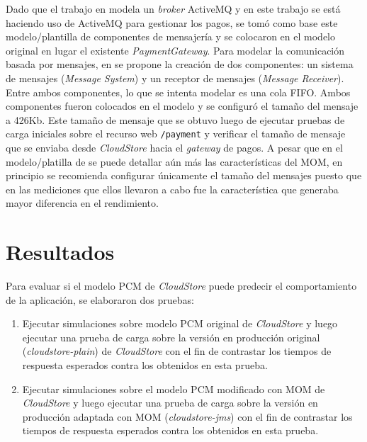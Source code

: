 \documentclass[conference]{IEEEtran}
\begin{document}
Dado que el trabajo en \cite{happe-et-al} modela un \emph{broker} ActiveMQ y en este trabajo se está haciendo uso de ActiveMQ para gestionar los pagos, se tomó como base este modelo/plantilla de componentes de mensajería y se colocaron en el modelo original en lugar el existente \emph{PaymentGateway}. Para modelar la comunicación basada por mensajes, en \cite{happe-et-al} se propone la creación de dos componentes: un sistema de mensajes (\emph{Message System}) y un receptor de mensajes (\emph{Message Receiver}). Entre ambos componentes, lo que se intenta modelar es una cola FIFO. Ambos componentes fueron colocados en el modelo y se configuró el tamaño del mensaje a 426Kb. Este tamaño de mensaje que se obtuvo luego de ejecutar pruebas de carga iniciales sobre el recurso web \texttt{/payment} y verificar el tamaño de mensaje que se enviaba desde \emph{CloudStore} hacia el \emph{gateway} de pagos. A pesar que en el modelo/platilla de \cite{happe-et-al} se puede detallar aún más las características del MOM, en principio se recomienda configurar únicamente el tamaño del mensajes puesto que en las mediciones que ellos llevaron a cabo fue la característica que generaba mayor diferencia en el rendimiento.

\section{Resultados} \label{sec:resultados}
Para evaluar si el modelo PCM de \emph{CloudStore} puede predecir el comportamiento de la aplicación, se elaboraron dos pruebas: 
\begin{enumerate}
    \item Ejecutar simulaciones sobre modelo PCM original de \emph{CloudStore} y luego ejecutar una prueba de carga sobre la versión en producción original (\emph{cloudstore-plain}) de \emph{CloudStore} con el fin de contrastar los tiempos de respuesta esperados contra los obtenidos en esta prueba.
    \item Ejecutar simulaciones sobre el modelo PCM modificado con MOM de \emph{CloudStore} y luego ejecutar una prueba de carga sobre la versión en producción adaptada con MOM (\emph{cloudstore-jms}) con el fin de contrastar los tiempos de respuesta esperados contra los obtenidos en esta prueba.
\end{enumerate}
\end{document}
